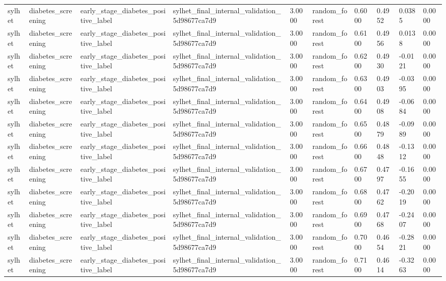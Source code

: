 \begin{tabular}{llllllllll}
sylhet & diabetes\_screening & early\_stage\_diabetes\_positive\_label & sylhet\_final\_internal\_validation\_5d98677ca7d9 & 3.0000 & random\_forest & 0.6000 & 0.4952 & 0.0385 & 0.0000 \\
sylhet & diabetes\_screening & early\_stage\_diabetes\_positive\_label & sylhet\_final\_internal\_validation\_5d98677ca7d9 & 3.0000 & random\_forest & 0.6100 & 0.4956 & 0.0138 & 0.0000 \\
sylhet & diabetes\_screening & early\_stage\_diabetes\_positive\_label & sylhet\_final\_internal\_validation\_5d98677ca7d9 & 3.0000 & random\_forest & 0.6200 & 0.4930 & -0.0121 & 0.0000 \\
sylhet & diabetes\_screening & early\_stage\_diabetes\_positive\_label & sylhet\_final\_internal\_validation\_5d98677ca7d9 & 3.0000 & random\_forest & 0.6300 & 0.4903 & -0.0395 & 0.0000 \\
sylhet & diabetes\_screening & early\_stage\_diabetes\_positive\_label & sylhet\_final\_internal\_validation\_5d98677ca7d9 & 3.0000 & random\_forest & 0.6400 & 0.4908 & -0.0684 & 0.0000 \\
sylhet & diabetes\_screening & early\_stage\_diabetes\_positive\_label & sylhet\_final\_internal\_validation\_5d98677ca7d9 & 3.0000 & random\_forest & 0.6500 & 0.4879 & -0.0989 & 0.0000 \\
sylhet & diabetes\_screening & early\_stage\_diabetes\_positive\_label & sylhet\_final\_internal\_validation\_5d98677ca7d9 & 3.0000 & random\_forest & 0.6600 & 0.4848 & -0.1312 & 0.0000 \\
sylhet & diabetes\_screening & early\_stage\_diabetes\_positive\_label & sylhet\_final\_internal\_validation\_5d98677ca7d9 & 3.0000 & random\_forest & 0.6700 & 0.4797 & -0.1655 & 0.0000 \\
sylhet & diabetes\_screening & early\_stage\_diabetes\_positive\_label & sylhet\_final\_internal\_validation\_5d98677ca7d9 & 3.0000 & random\_forest & 0.6800 & 0.4762 & -0.2019 & 0.0000 \\
sylhet & diabetes\_screening & early\_stage\_diabetes\_positive\_label & sylhet\_final\_internal\_validation\_5d98677ca7d9 & 3.0000 & random\_forest & 0.6900 & 0.4768 & -0.2407 & 0.0000 \\
sylhet & diabetes\_screening & early\_stage\_diabetes\_positive\_label & sylhet\_final\_internal\_validation\_5d98677ca7d9 & 3.0000 & random\_forest & 0.7000 & 0.4654 & -0.2821 & 0.0000 \\
sylhet & diabetes\_screening & early\_stage\_diabetes\_positive\_label & sylhet\_final\_internal\_validation\_5d98677ca7d9 & 3.0000 & random\_forest & 0.7100 & 0.4614 & -0.3263 & 0.0000 \\

\end{tabular}

